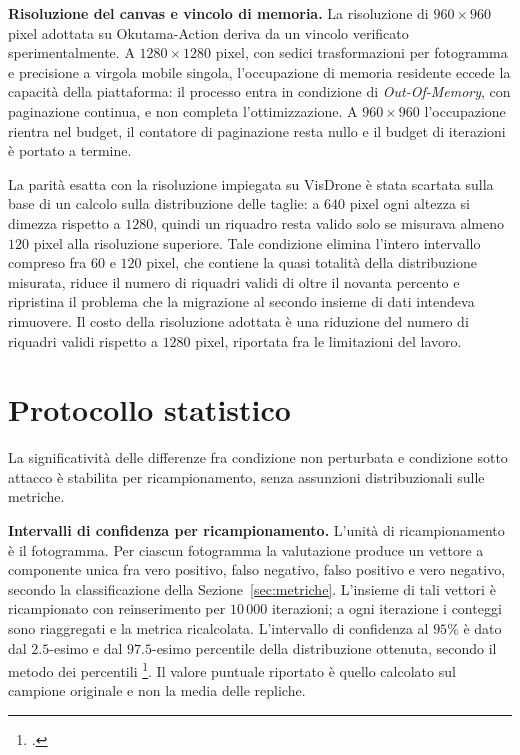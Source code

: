 \ifstampa\documentclass[a4paper,12pt,twoside,openright]{report}\else\documentclass[a4paper,12pt]{report}\fi
\newif\ifrevisione \revisionefalse
\DeclareRobustCommand{\rev}[1]{\ifrevisione{\color{blue!65!black}#1}\else#1\fi}
\begin{document}
\textbf{Risoluzione del canvas e vincolo di memoria.}
\label{sec:risoluzione}
La risoluzione di $960 \times 960$ pixel adottata su Okutama-Action deriva da un
vincolo verificato sperimentalmente. A $1280 \times 1280$ pixel, con sedici
trasformazioni per fotogramma e precisione a virgola mobile singola,
l'occupazione di memoria residente eccede la capacità della piattaforma: il
processo entra in condizione di \textit{Out-Of-Memory}, con paginazione
continua, e non completa l'ottimizzazione. A $960 \times 960$ l'occupazione
rientra nel budget, il contatore di paginazione resta nullo e il budget di
iterazioni è portato a termine.

La parità esatta con la risoluzione impiegata su VisDrone è stata scartata sulla
base di un calcolo sulla distribuzione delle taglie: a $640$ pixel ogni altezza
si dimezza rispetto a $1280$, quindi un riquadro resta valido solo se misurava
almeno $120$ pixel alla risoluzione superiore. Tale condizione elimina l'intero
intervallo compreso fra $60$ e \rev{$120$} pixel, che \rev{contiene} la quasi totalità
della distribuzione misurata, riduce il numero di riquadri validi di oltre il
novanta percento e ripristina il problema che la migrazione al secondo insieme
di dati intendeva rimuovere. Il costo della risoluzione adottata è una riduzione
del numero di riquadri validi rispetto a $1280$ pixel, riportata fra le
limitazioni del lavoro.

\section{Protocollo statistico}
\label{sec:protocollo}

La significatività delle differenze fra condizione non perturbata e condizione
sotto attacco è stabilita per ricampionamento, senza assunzioni distribuzionali
sulle metriche.

\textbf{Intervalli di confidenza per ricampionamento.}
\label{sec:bootstrap}
L'unità di ricampionamento è il fotogramma. Per ciascun fotogramma la
valutazione produce un vettore a componente unica fra vero positivo, falso
negativo, falso positivo e vero negativo, secondo la classificazione della
Sezione~\ref{sec:metriche}. L'insieme di tali vettori è ricampionato con
reinserimento per $10\,000$ iterazioni; a ogni iterazione i conteggi sono
riaggregati e la metrica ricalcolata. L'intervallo di confidenza al $95\%$ è
dato dal $2.5$-esimo e dal $97.5$-esimo percentile della distribuzione ottenuta,
secondo il metodo dei percentili \footcite{efron_1993_bootstrap}. Il valore
puntuale riportato è quello calcolato sul campione originale e non la media
delle repliche.
\end{document}
